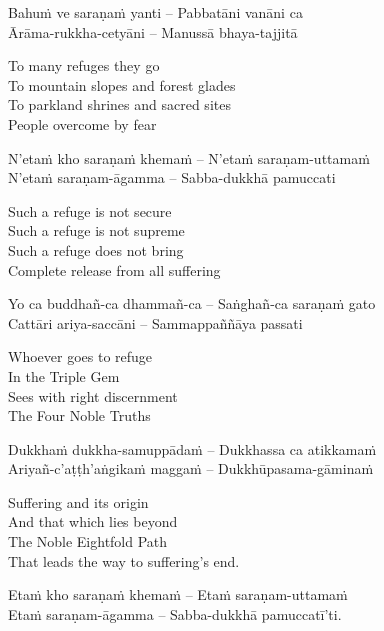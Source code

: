 Bahuṁ ve saraṇaṁ yanti – Pabbatāni vanāni ca\\
Ārāma-rukkha-cetyāni – Manussā bhaya-tajjitā\\

\begin{english}
  To many refuges they go\\
  To mountain slopes and forest glades\\
  To parkland shrines and sacred sites\\
  People overcome by fear
\end{english}

N'etaṁ kho saraṇaṁ khemaṁ – N'etaṁ saraṇam-uttamaṁ\\
N'etaṁ saraṇam-āgamma – Sabba-dukkhā pamuccati\\

\begin{english}
  Such a refuge is not secure\\
  Such a refuge is not supreme\\
  Such a refuge does not bring\\
  Complete release from all suffering
\end{english}

Yo ca buddhañ-ca dhammañ-ca – Saṅghañ-ca saraṇaṁ gato\\
Cattāri ariya-saccāni – Sammappaññāya passati\\

\begin{english}
  Whoever goes to refuge\\
  In the Triple Gem\\
  Sees with right discernment\\
  The Four Noble Truths
\end{english}

Dukkhaṁ dukkha-samuppādaṁ – Dukkhassa ca atikkamaṁ\\
Ariyañ-c'aṭṭh'aṅgikaṁ maggaṁ – Dukkhūpasama-gāminaṁ\\

\begin{english}
  Suffering and its origin\\
  And that which lies beyond\\
  The Noble Eightfold Path\\
  That leads the way to suffering's end.
\end{english}

Etaṁ kho saraṇaṁ khemaṁ – Etaṁ saraṇam-uttamaṁ\\
Etaṁ saraṇam-āgamma – Sabba-dukkhā pamuccatī'ti.

